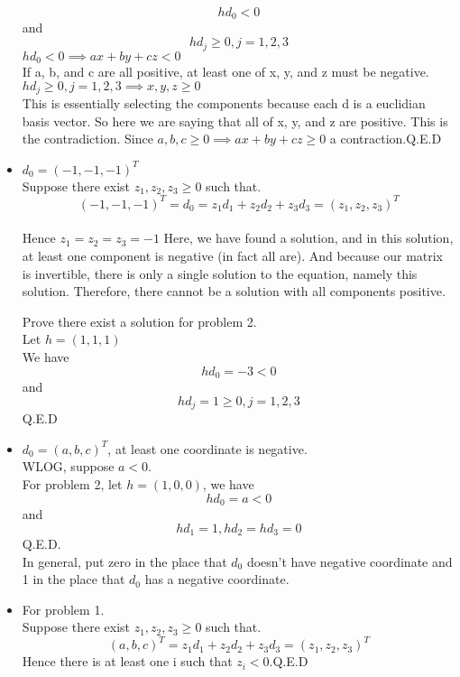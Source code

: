 \documentclass[12pt]{article}
\begin{document}
\begin{itemize}
$$hd_{0}<0 $$ and\\
$$hd_{j} \geq 0, j =1,2,3 $$
$hd_{0}<0 \implies ax+by+cz < 0$\\
If a, b, and c are all positive, at least one of x, y, and z must be negative.
$ hd_{j} \geq 0, j =1,2,3 \implies x,y,z \geq 0$\\
This is essentially selecting the components because each d is a euclidian basis vector. So here we are saying that all of x, y, and z are positive. This is the contradiction. Since $a,b,c \geq 0 \implies ax+by+cz \geq 0$ a contraction.Q.E.D

\item $d_{0} = (-1,-1,-1)^{T}$\\
Suppose there exist $z_{1},z_{2},z_{3} \geq 0$ such that.\\
$$(-1,-1,-1)^{T} = d_{0} = z_{1}d_{1}+z_{2}d_{2}
+z_{3}d_{3} = (z_{1},z_{2},z_{3})^{T}$$\\
Hence $z_{1}=z_{2}=z_{3}=-1$ Here, we have found a solution, and in this solution, at least one component is negative (in fact all are).  And because our matrix is invertible, there is only a single solution to the equation, namely this solution. Therefore, there cannot be a solution with all components positive.

Prove there exist a solution for problem 2.\\
Let $h=(1,1,1)$\\
We have
$$hd_{0} = -3<0 $$ and\\
$$hd_{j}  = 1 \geq 0, j =1,2,3 $$Q.E.D

\item $d_{0} = (a,b,c)^{T}$, at least one coordinate is negative.\\
WLOG, suppose $a < 0$.\\
For problem 2, let $h = (1,0,0)$, we have\\
$$hd_{0} = a < 0 $$ and\\
$$hd_{1} = 1, hd_{2} = hd_{3} =0 $$ Q.E.D.\\
In general, put zero in the place that $d_{0} $ doesn't have negative coordinate and 1 in the place that $d_{0} $ has a negative coordinate.\\
\item For problem 1.\\
Suppose there exist $z_{1},z_{2},z_{3} \geq 0$ such that.\\
$$(a,b,c)^{T} = z_{1}d_{1}+z_{2}d_{2}+z_{3}d_{3}= (z_{1},z_{2},z_{3})^{T}$$
Hence there is at least one i such that $z_{i}<0$.Q.E.D



















\end{itemize}
\end{document}
